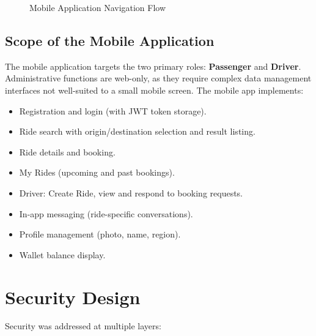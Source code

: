 \documentclass[12pt,a4paper,openright]{report}
\begin{document}
\begin{figure}[H]
\centering
{}
\caption{Mobile Application Navigation Flow}
\label{fig:mobile-nav}
\end{figure}

\subsection{Scope of the Mobile Application}

The mobile application targets the two primary roles: \textbf{Passenger} and \textbf{Driver}. Administrative functions are web-only, as they require complex data management interfaces not well-suited to a small mobile screen. The mobile app implements:

\begin{itemize}[noitemsep]
    \item Registration and login (with JWT token storage).
    \item Ride search with origin/destination selection and result listing.
    \item Ride details and booking.
    \item My Rides (upcoming and past bookings).
    \item Driver: Create Ride, view and respond to booking requests.
    \item In-app messaging (ride-specific conversations).
    \item Profile management (photo, name, region).
    \item Wallet balance display.
\end{itemize}

\section{Security Design}

Security was addressed at multiple layers:
\end{document}
